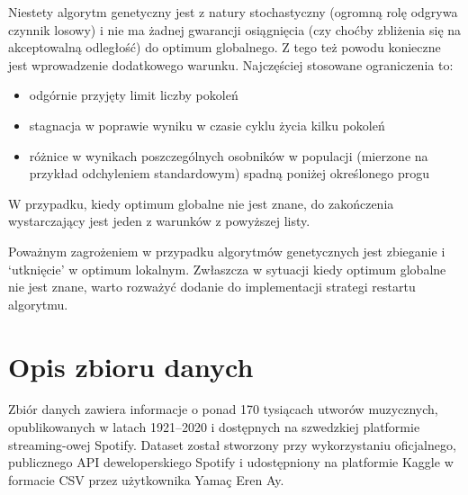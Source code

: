 \documentclass[a4paper,11pt]{article}
\begin{document}
    \noindent
    \begin{minipage}[H]{\textwidth}
        \setlength\parindent{17pt} Niestety algorytm genetyczny jest z natury stochastyczny (ogromną rolę odgrywa czynnik losowy) i nie ma żadnej gwarancji osiągnięcia (czy choćby zbliżenia się na akceptowalną odległość) do optimum globalnego. Z tego też powodu konieczne jest wprowadzenie dodatkowego warunku. Najczęściej stosowane ograniczenia to\cite{IntroductionToEvolutionaryComputing2015}:
        \begin{itemize}
            \item odgórnie przyjęty limit liczby pokoleń
            \item stagnacja w poprawie wyniku w czasie cyklu życia kilku pokoleń
            \item różnice w wynikach poszczególnych osobników w populacji (mierzone na przykład odchyleniem standardowym) spadną poniżej określonego progu
        \end{itemize}
    \end{minipage}

    \bigskip

    W przypadku, kiedy optimum globalne nie jest znane, do zakończenia wystarczający jest jeden z warunków z powyższej listy\cite{IntroductionToEvolutionaryComputing2015}.

    \bigskip

    Poważnym zagrożeniem w przypadku algorytmów genetycznych jest zbieganie i `utknięcie' w optimum lokalnym. Zwłaszcza w sytuacji kiedy optimum globalne nie jest znane, warto rozważyć dodanie do implementacji strategi restartu algorytmu\cite{GeneticAlgorithmEssentials2017}.


    \section{Opis zbioru danych}

    Zbiór danych zawiera informacje o ponad 170 tysiącach utworów muzycznych, opublikowanych w latach 1921--2020 i dostępnych na szwedzkiej platformie streaming-owej Spotify. Dataset został stworzony przy wykorzystaniu oficjalnego, publicznego API deweloperskiego Spotify i udostępniony na platformie Kaggle w formacie CSV przez użytkownika Yamaç Eren Ay\cite{SpotifyKaggleDataset2020}.

    \bigskip
\end{document}
